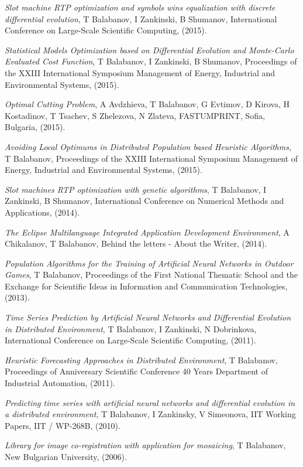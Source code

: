 \documentclass[english,a4paper]{europasscv}
\begin{document}
\begin{europasscv}
{\begin{ecvitemize}
    \item \textit{Slot machine RTP optimization and symbols wins equalization with discrete differential evolution}, T Balabanov, I Zankinski, B Shumanov, International Conference on Large-Scale Scientific Computing, (2015).
    \item \textit{Statistical Models Optimization based on Differential Evolution and Monte-Carlo Evaluated Cost Function}, T Balabanov, I Zankinski, B Shumanov, Proceedings of the XXIII International Symposium Management of Energy, Industrial and Environmental Systems, (2015).
    \item \textit{Optimal Cutting Problem}, A Avdzhieva, T Balabanov, G Evtimov, D Kirova, H Kostadinov, T Tsachev, S Zhelezova, N Zlateva, FASTUMPRINT, Sofia, Bulgaria, (2015).
    \item \textit{Avoiding Local Optimums in Distributed Population based Heuristic Algorithms}, T Balabanov, Proceedings of the XXIII International Symposium Management of Energy, Industrial and Environmental Systems, (2015).
    \item \textit{Slot machines RTP optimization with genetic algorithms}, T Balabanov, I Zankinski, B Shumanov, International Conference on Numerical Methods and Applications, (2014).
    \item \textit{The Eclipse Multilanguage Integrated Application Development Environment}, A Chikalanov, T Balabanov, Behind the letters - About the Writer, (2014).
    \item \textit {Population Algorithms for the Training of Artificial Neural Networks in Outdoor Games}, T Balabanov, Proceedings of the First National Thematic School and the Exchange for Scientific Ideas in Information and Communication Technologies, (2013).
    \item \textit{Time Series Prediction by Artificial Neural Networks and Differential Evolution in Distributed Environment}, T Balabanov, I Zankinski, N Dobrinkova, International Conference on Large-Scale Scientific Computing, (2011).
    \item \textit{Heuristic Forecasting Approaches in Distributed Environment}, T Balabanov, Proceedings of Anniversary Scientific Conference 40 Years Department of Industrial Automation, (2011).
    \item \textit{Predicting time series with artificial neural networks and differential evolution in a distributed environment}, T Balabanov, I Zankinsky, V Simeonova, IIT Working Papers, IIT / WP-268B, (2010).
    \item \textit{Library for image co-registration with application for mosaicing}, T Balabanov, New Bulgarian University, (2006).
  \end{ecvitemize}}
  
  \end{europasscv}
\end{document}
